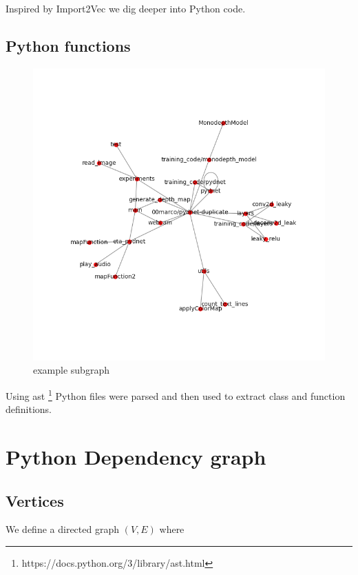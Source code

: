 \documentclass[11pt]{report}
\begin{document}
Inspired by Import2Vec we dig deeper into Python code.

\subsection{Python functions}


\begin{center}
\begin{figure}[h]
\centering
\includegraphics[scale=0.5]{./img/graph_plot.png}
\caption{example subgraph}
\end{figure}
\end{center}


Using ast \footnote{https://docs.python.org/3/library/ast.html} Python files were parsed and then used to extract class and function definitions.


\section{Python Dependency graph}
\label{python-graph}

\subsection{Vertices}

We define a directed graph  \((V, E)\) where 
\end{document}
